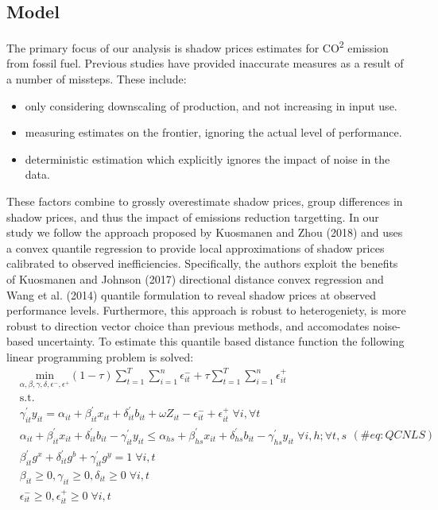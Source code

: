 \documentclass[
  10pt,
]{article}
\providecommand{\tightlist}{%
  \setlength{\itemsep}{0pt}\setlength{\parskip}{0pt}}
\begin{document}
\hypertarget{model}{%
\subsection{Model}\label{model}}

The primary focus of our analysis is shadow prices estimates for
CO\textsuperscript{2} emission from fossil fuel. Previous studies have
provided inaccurate measures as a result of a number of missteps. These
include:

\begin{itemize}
\tightlist
\item
  only considering downscaling of production, and not increasing in
  input use.
\item
  measuring estimates on the frontier, ignoring the actual level of
  performance.
\item
  deterministic estimation which explicitly ignores the impact of noise
  in the data.
\end{itemize}

These factors combine to grossly overestimate shadow prices, group
differences in shadow prices, and thus the impact of emissions reduction
targetting. In our study we follow the approach proposed by Kuosmanen
and Zhou (2018) and uses a convex quantile regression to provide local
approximations of shadow prices calibrated to observed inefficiencies.
Specifically, the authors exploit the benefits of Kuosmanen and Johnson
(2017) directional distance convex regression and Wang et al. (2014)
quantile formulation to reveal shadow prices at observed performance
levels. Furthermore, this approach is robust to heterogeniety, is more
robust to direction vector choice than previous methods, and accomodates
noise-based uncertainty. To estimate this quantile based distance
function the following linear programming problem is solved:
\begin{equation}
\begin{split}
& \underset{\alpha,\beta,\gamma,\delta,\epsilon^-,\epsilon^+}{\text{min}}
 (1-\tau) \sum^{T}_{t=1} \sum^{n}_{i=1}\epsilon^-_{it} + \tau \sum^{T}_{t=1}  \sum^{n}_{i=1}\epsilon^+_{it}  \\
&\text{s.t.} \\
&\gamma^{'}_{it}y_{it}=\alpha_{it}+\beta^{'}_{it}x_{it}+\delta^{'}_{it}b_{it} + \omega Z_{it} -\epsilon^-_{it}+\epsilon^+_{it} \; \forall i ,\forall t \\
&\alpha_{it}+\beta^{'}_{it}x_{it}+\delta^{'}_{it}b_{it}-\gamma^{'}_{it}y_{it} \leq \alpha_{hs}+\beta^{'}_{hs}x_{it}+\delta^{'}_{hs}b_{it}-\gamma^{'}_{hs}y_{it} \; \forall i,h ; \forall t,s \\
& \beta^{'}_{it}g^x+\delta^{'}_{it}g^b+\gamma^{'}_{it}g^y=1 \; \forall i,t\\
& \beta_{it} \geq0,\gamma_{it} \geq0,\delta_{it} \geq0 \; \forall i,t \\
& \epsilon^-_{it} \geq0, \epsilon^+_{it} \geq 0 \; \forall i,t
\end{split}
(\#eq:QCNLS)
\end{equation}
\end{document}
